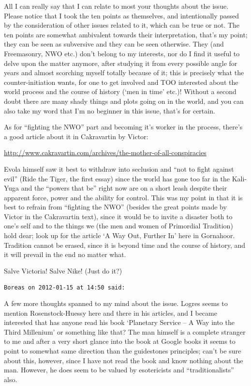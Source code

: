 \begin{footnotesize}
\begin{sffamily}
All I can really say that I can relate to most your thoughts about the issue. Please notice that I took the ten points as themselves, and intentionally passed by the consideration of other issues related to it, which can be true or not. The ten points are somewhat ambivalent towards their interpretation, that's my point; they can be seen as subversive and they can be seen otherwise. They (and Freemasonry, NWO etc.) don't belong to my interests, nor do I find it useful to delve upon the matter anymore, after studying it from every possible angle for years and almost scorching myself totally because of it; this is precisely what the counter-initiation wants, for one to get involved and TOO interested about the world process and the course of history (`men in time' etc.)! Without a second doubt there are many shady things and plots going on in the world, and you can also take my word that I'm no beginner in this issue, that's for certain.

As for ``fighting the NWO'' part and becoming it's worker in the process, there's a good article about it in Cakravartin by Victor:

\url{http://www.cakravartin.com/archives/the-mother-of-all-conspiracies}


Evola himself saw it best to withdraw into seclusion and ``not to fight against evil'' (Ride the Tiger, the first essay) since the world has gone too far in the Kali-Yuga and the ``powers that be'' right now are on a short leash despite their apparent force, power and the ability for control. This was my point in that it is best to refrain from ``fighting the NWO'' (besides the great points made by Victor in the Cakravartin text), since it would be to invite a disaster both to one's self and to the things we (the men and women of Primordial Tradition) hold dear; look up for the article `A Way Out, Further In' here in Gornahoor. Tradition cannot be erased, since it is beyond time and the course of history, and it will prevail in the end no matter what.

Salve Victoria! Salve Nike! (Just do it?)

\hfill

\texttt{Boreas on 2012-01-15 at 14:50 said:}

A few more thoughts spanned to my mind about the issue. Logres seems to mention Rosenstock-Huessy here and there in his articles, and I became interested that has anyone read his book `Planetary Service -- A Way into the Third Millenium' or something like that? The man himself is a complete stranger to me and after a very short glance into the book at Google books it seems to point to somewhat same direction than the guidestones principles; can't be sure about this, however, since I have not read the book and know nothing about the man. However, he does seem to be valued by esotericists and ``traditionalists'' also.


\end{sffamily}
\end{footnotesize}
